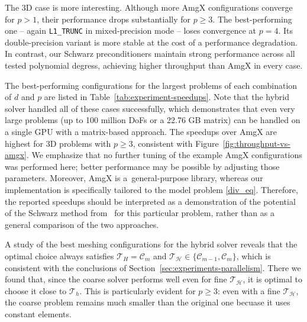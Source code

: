 \documentclass[11pt]{article}
\theoremstyle{definition}
\theoremstyle{theorem}
\begin{document}
The 3D case is more interesting. Although more AmgX configurations converge for $p>1$,
their performance drops substantially for $p\geq 3$. The best-performing one
-- again \verb|L1_TRUNC| in mixed-precision mode -- loses convergence at
$p=4$. Its double-precision variant is more stable at the cost
of a performance degradation. In contrast, our Schwarz preconditioners maintain
strong performance across all tested polynomial degress, achieving higher throughput
than AmgX in every case.

The best-performing configurations for the largest problems of each combination of $d$
and $p$ are listed in Table~\ref{tab:experiment-speedups}. Note that the hybrid
solver handled all of these cases successfully, which demonstrates that even very large problems
(up to 100 million DoFs or a 22.76 GB matrix) can be handled on a single GPU
with a matrix-based approach. The speedups over AmgX are highest for 3D problems
with $p\geq 3$, consistent with Figure~\ref{fig:throughput-vs-amgx}. We emphasize
that no further tuning of the example AmgX
configurations was performed here; better performance may be possible by adjusting
those parameters. Moreover, AmgX is a~general-purpose library, whereas our
implementation is specifically tailored to the model problem \eqref{div_eq}.
Therefore, the reported speedups should be interpreted as a demonstration of the
potential of the Schwarz method from~\cite{Przykry} for this particular problem,
rather than as a general comparison of the two approaches.

\begin{table}
  \centering
  \caption{Best solution times obtained for problems listed in Table~\ref{tab:experiment-largest-problems}.
  For $d=2$, $p=4$, $\mathcal{T}_h=\mathcal{S}_{10}$ all AmgX configurations failed
  due to out-of-memory errors.}
  
  \label{tab:experiment-speedups}
\end{table}

A study of the best meshing configurations for the hybrid solver reveals that
the optimal choice always satisfies $\mathcal{T}_H=\mathcal{C}_m$ and
$\mathcal{T}_\mathcal{H}\in \{\mathcal{C}_{m-1}, \mathcal{C}_m\}$, which is
consistent with the conclusions of Section~\ref{sec:experiments-parallelism}.
There we found that, since the coarse solver performs well even for fine
$\mathcal{T}_\mathcal{H}$, it is optimal to choose
it close to $\mathcal{T}_h$. This is particularly evident for $p\geq 3$: even
with a fine $\mathcal{T}_\mathcal{H}$, the coarse problem remains much
smaller than the original one becuase it uses constant elements.
\end{document}
